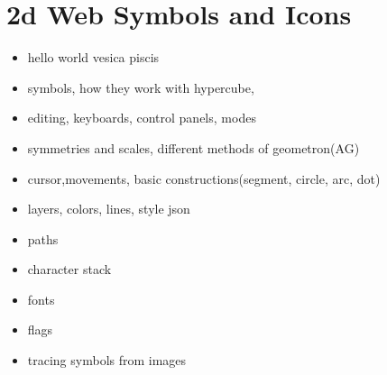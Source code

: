 

\section{2d Web Symbols and Icons}

\begin{itemize}
\tightlist
\item
hello world vesica piscis
\item
symbols, how they work with hypercube, 
\item
editing, keyboards, control panels, modes
\item
symmetries and scales, different methods of geometron(AG)
\item
cursor,movements, basic constructions(segment, circle, arc, dot)
\item
layers, colors, lines, style json
\item
paths
\item
character stack
\item
fonts
\item
flags
\item
tracing symbols from images
\end{itemize}